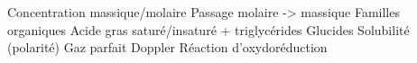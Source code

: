 Concentration massique/molaire
Passage molaire -> massique
Familles organiques
Acide gras saturé/insaturé + triglycérides
Glucides
Solubilité (polarité)
Gaz parfait
Doppler
Réaction d'oxydoréduction